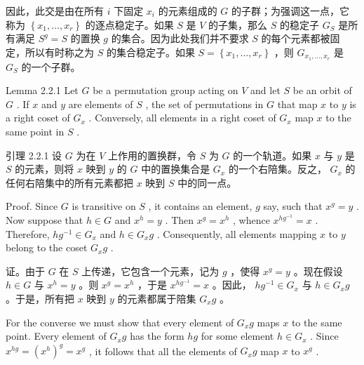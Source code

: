 \documentclass[10pt]{article}
\begin{document}
\begin{tcolorbox}\relax
因此，此交是由在所有 \(i\) 下固定 \({x}_{i}\) 的元素组成的 \(G\) 的子群；为强调这一点，它称为 \(\left\{  {{x}_{1},\ldots ,{x}_{r}}\right\}\) 的逐点稳定子。如果 \(S\) 是 \(V\) 的子集，那么 \(S\) 的稳定子 \({G}_{S}\) 是所有满足 \({S}^{g} = S\) 的置换 \(g\) 的集合。因为此处我们并不要求 \(S\) 的每个元素都被固定，所以有时称之为 \(S\) 的集合稳定子。如果 \(S = \left\{  {{x}_{1},\ldots ,{x}_{r}}\right\}\) ，则 \({G}_{{x}_{1},\ldots ,{x}_{r}}\) 是 \({G}_{S}\) 的一个子群。
\end{tcolorbox}

Lemma 2.2.1 Let \(G\) be a permutation group acting on \(V\) and let \(S\) be an orbit of \(G\) . If \(x\) and \(y\) are elements of \(S\) , the set of permutations in \(G\) that map \(x\) to \(y\) is a right coset of \({G}_{x}\) . Conversely, all elements in a right coset of \({G}_{x}\) map \(x\) to the same point in \(S\) .

\begin{tcolorbox}\relax
引理 2.2.1 设 \(G\) 为在 \(V\) 上作用的置换群，令 \(S\) 为 \(G\) 的一个轨道。如果 \(x\) 与 \(y\) 是 \(S\) 的元素，则将 \(x\) 映到 \(y\) 的 \(G\) 中的置换集合是 \({G}_{x}\) 的一个右陪集。反之， \({G}_{x}\) 的任何右陪集中的所有元素都把 \(x\) 映到 \(S\) 中的同一点。
\end{tcolorbox}

Proof. Since \(G\) is transitive on \(S\) , it contains an element, \(g\) say, such that \({x}^{g} = y\) . Now suppose that \(h \in  G\) and \({x}^{h} = y\) . Then \({x}^{g} = {x}^{h}\) , whence \({x}^{h{g}^{-1}} = x\) . Therefore, \(h{g}^{-1} \in  {G}_{x}\) and \(h \in  {G}_{x}g\) . Consequently, all elements mapping \(x\) to \(y\) belong to the coset \({G}_{x}g\) .

\begin{tcolorbox}\relax
证。由于 \(G\) 在 \(S\) 上传递，它包含一个元素，记为 \(g\) ，使得 \({x}^{g} = y\) 。现在假设 \(h \in  G\) 与 \({x}^{h} = y\) 。则 \({x}^{g} = {x}^{h}\) ，于是 \({x}^{h{g}^{-1}} = x\) 。因此， \(h{g}^{-1} \in  {G}_{x}\) 与 \(h \in  {G}_{x}g\) 。于是，所有把 \(x\) 映到 \(y\) 的元素都属于陪集 \({G}_{x}g\) 。
\end{tcolorbox}

For the converse we must show that every element of \({G}_{x}g\) maps \(x\) to the same point. Every element of \({G}_{x}g\) has the form \({hg}\) for some element \(h \in  {G}_{x}\) . Since \({x}^{hg} = {\left( {x}^{h}\right) }^{g} = {x}^{g}\) , it follows that all the elements of \({G}_{x}g\) map \(x\) to \({x}^{g}\) .
\end{document}
